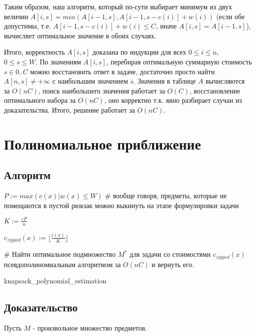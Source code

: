 \documentclass{article}
\begin{document}
Таким образом, наш алгоритм, который по-сути выбирает минимум из двух величин $A[i, s] = min(A[i - 1, s], A[i - 1, s - c(i)] + w(i))$ (если обе допустимы, т.е. $A[i - 1, s - c(i)] + w(i) \leq C$, иначе $A[i, s] = A[i-1, s]$), вычисляет оптимальное значение в обоих случаях. 

Итого, корректность $A[i, s]$ доказана по индукции для всех $ 0 \leq i \leq n$, $0 \leq s \leq W$. По значениям $A[i, s]$, перебирая оптимальную суммарную стоимость $s \in 0..C$ можно восстановить ответ в задаче, достаточно просто найти $A[n, s] \neq +\infty$ с наибольшим значением $s$. Значения в таблице $A$ вычисляются за $O(nC)$, поиск наибольшего значения работает за $O(C)$, восстановление оптимального набора за $O(nC)$, оно корректно т.к. явно разбирает случаи из доказательства. Итого, решение работает за $O(nC)$.
\section{Полиномиальное приближение}
\subsection{Алгоритм}

\begin{algorithm}[H]
	\SetAlgoLined %
	
	$P := max(c(x) | w(x) \leq W)$  \# вообще говоря, предметы, которые не помещаются в пустой рюкзак можно выкинуть на этапе формулировки задачи
	
	$K := \frac{\varepsilon P}{n}$
	
	$c_{zipped}(x) := \lfloor \frac{c(x)}{K} \rfloor $
	
	 \# Найти оптимальное подмножество $M^*$ для задачи со стоимостями $c_{zipped}(x)$ псевдополиномиальным алгоритмом за $O(nC)$ и вернуть его.
	\caption{knapsack\_polynomial\_estimation}
\end{algorithm}

\subsection{Доказательство}

Пусть $M$ - произвольное множество предметов.
\end{document}
